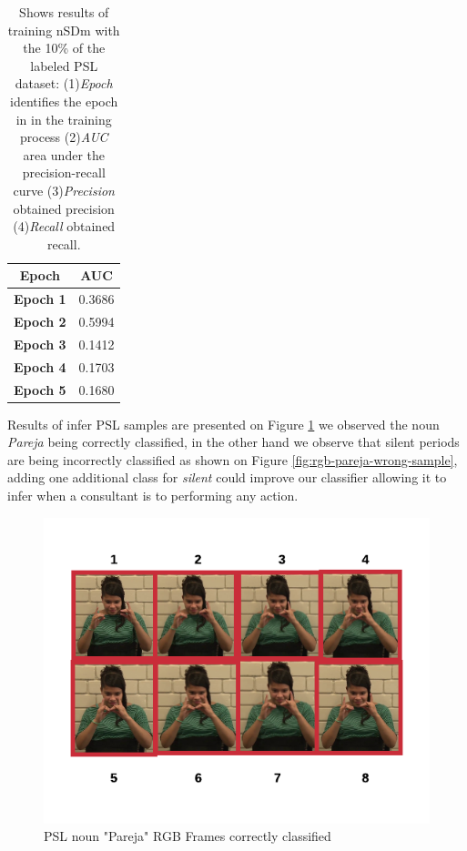 \documentclass[twocolumn,conference]{article}
\begin{document}
\begin{table}[!htb]
\captionsetup{font=footnotesize}
\centering
\begin{tabular}{ p{16em} c }
\toprule
\multicolumn{1}{c}{\textbf{Epoch}} & 
	\multicolumn{1}{c}{\textbf{AUC}}\\
\midrule
\textbf{Epoch 1}&	0.3686\\
\textbf{Epoch 2}&	0.5994\\
\textbf{Epoch 3}&	0.1412\\
\textbf{Epoch 4}&	0.1703\\
\textbf{Epoch 5}&	0.1680\\
\bottomrule
\end{tabular}
\caption{Shows results of training nSDm with the 10\% of the labeled PSL dataset: (1)\textit{Epoch} identifies the epoch in in the training process (2)\textit{AUC} area under the precision-recall curve (3)\textit{Precision} obtained precision (4)\textit{Recall} obtained recall.}
\label{tab:signs-detection-results-10-percent}
\end{table}

Results of infer PSL samples are presented on Figure \ref{fig:rgb-pareja-sample} we observed the noun \textit{Pareja} being correctly classified, in the other hand we observe that silent periods are being incorrectly classified as shown on Figure \ref{fig:rgb-pareja-wrong-sample}, adding one additional class for \textit{silent} could improve our classifier allowing it to infer when a consultant is to performing any action.

\begin{figure}[hbt!]
\includegraphics[width=\linewidth]{images/pareja-rgb-frames.png}
\caption{PSL noun "Pareja" RGB Frames correctly classified}
\label{fig:rgb-pareja-sample}
\end{figure}
\end{document}
